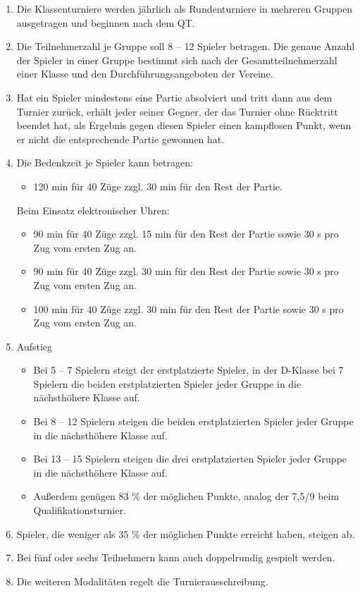 \documentclass[fontsize=12pt, paper=a4, ngerman]{article}
\begin{document}
\begin{enumerate}
\item Die Klassenturniere werden jährlich als Rundenturniere in mehreren Gruppen ausgetragen und beginnen nach dem QT.
\item Die Teilnehmerzahl je Gruppe soll 8 -- 12 Spieler betragen. Die genaue Anzahl der Spieler in einer Gruppe bestimmt sich nach der Gesamtteilnehmerzahl
einer Klasse und den Durchführungsangeboten der Vereine.
\item Hat ein Spieler mindestens eine Partie absolviert und tritt dann aus dem Turnier zurück, erhält jeder seiner Gegner, der das Turnier ohne Rücktritt beendet hat,
als Ergebnis gegen diesen Spieler einen kampflosen Punkt, wenn er nicht die entsprechende Partie gewonnen hat.
\item Die Bedenkzeit je Spieler kann betragen:
  \begin{itemize}
  \item 120 min für 40 Züge zzgl. 30 min für den Rest der Partie.
  \end{itemize}
  Beim Einsatz elektronischer Uhren:
  \begin{itemize}
  \item 90 min für 40 Züge zzgl. 15 min für den Rest der Partie sowie 30 s pro Zug vom ersten Zug an.
  \item 90 min für 40 Züge zzgl. 30 min für den Rest der Partie sowie 30 s pro Zug vom ersten Zug an.
  \item 100 min für 40 Züge zzgl. 30 min für den Rest der Partie sowie 30 s pro Zug vom ersten Zug an.
  \end{itemize}
\item Aufstieg
  \begin{itemize}
  \item Bei 5 -- 7 Spielern steigt der erstplatzierte Spieler, in der D-Klasse bei 7 Spielern die beiden erstplatzierten Spieler jeder Gruppe in die nächsthöhere Klasse auf.
  \item Bei 8 -- 12 Spielern steigen die beiden erstplatzierten Spieler jeder Gruppe in die nächsthöhere Klasse auf.
  \item Bei 13 -- 15 Spielern steigen die drei erstplatzierten Spieler jeder Gruppe in die nächsthöhere Klasse auf.
  \item Außerdem genügen 83 \% der möglichen Punkte, analog der 7,5/9 beim Qualifikationsturnier.
  \end{itemize}
\item Spieler, die weniger als 35 \% der möglichen Punkte erreicht haben, steigen ab.
\item Bei fünf oder sechs Teilnehmern kann auch doppelrundig gespielt werden.
\item Die weiteren Modalitäten regelt die Turnierausschreibung.
\end{enumerate}
\end{document}
